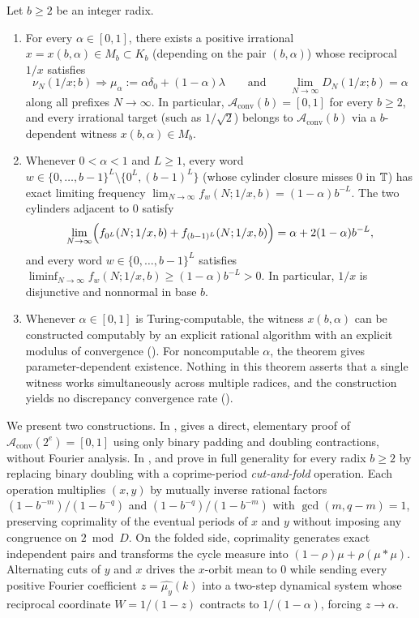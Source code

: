 \documentclass[11pt]{article}
\newcommand{\Aconv}{\mathcal{A}_{\mathrm{conv}}}
\begin{document}
\begin{maintheorem}\label{thm:A}
Let $b\ge2$ be an integer radix.
\begin{enumerate}[label=\textup{(\roman*)},nosep]
\item For every $\alpha\in[0,1]$, there exists a positive irrational $x=x(b,\alpha)\in M_b\subset K_b$ (depending on the pair $(b,\alpha)$) whose reciprocal $1/x$ satisfies
\[
\nu_N(1/x;b)\Longrightarrow \mu_\alpha:=\alpha\delta_0+(1-\alpha)\lambda\qquad\text{and}\qquad \lim_{N\to\infty}D_N(1/x;b)=\alpha
\]
along all prefixes $N\to\infty$. In particular, $\Aconv(b)=[0,1]$ for every $b\ge2$, and every irrational target (such as $1/\sqrt2$) belongs to $\Aconv(b)$ via a $b$-dependent witness $x(b,\alpha)\in M_b$.
\item Whenever $0<\alpha<1$ and $L\ge1$, every word $w\in\{0,\dots,b-1\}^L\setminus\{0^L,(b-1)^L\}$ (whose cylinder closure misses $0$ in $\mathbb T$) has exact limiting frequency $\lim_{N\to\infty}f_w(N;1/x,b)=(1-\alpha)b^{-L}$. The two cylinders adjacent to $0$ satisfy
\[
\lim_{N\to\infty}\Bigl(f_{0^L}(N;1/x,b)+f_{(b-1)^L}(N;1/x,b)\Bigr)=\alpha+2(1-\alpha)b^{-L},
\]
and every word $w\in\{0,\dots,b-1\}^L$ satisfies $\liminf_{N\to\infty}f_w(N;1/x,b)\ge(1-\alpha)b^{-L}>0$. In particular, $1/x$ is disjunctive and nonnormal in base $b$.
\item Whenever $\alpha\in[0,1]$ is Turing-computable, the witness $x(b,\alpha)$ can be constructed computably by an explicit rational algorithm with an explicit modulus of convergence (). For noncomputable $\alpha$, the theorem gives parameter-dependent existence. Nothing in this theorem asserts that a single witness works simultaneously across multiple radices, and the construction yields no discrepancy convergence rate ().
\end{enumerate}
\end{maintheorem}

We present two constructions. In ,  gives a direct, elementary proof of $\Aconv(2^e)=[0,1]$ using only binary padding and doubling contractions, without Fourier analysis. In ,  and  prove  in full generality for every radix $b\ge2$ by replacing binary doubling with a coprime-period \emph{cut-and-fold} operation. Each operation multiplies $(x,y)$ by mutually inverse rational factors $(1-b^{-m})/(1-b^{-q})$ and $(1-b^{-q})/(1-b^{-m})$ with $\gcd(m,q-m)=1$, preserving coprimality of the eventual periods of $x$ and $y$ without imposing any congruence on $2\bmod D$. On the folded side, coprimality generates exact independent pairs and transforms the cycle measure into $(1-\rho)\mu+\rho(\mu*\mu)$. Alternating cuts of $y$ and $x$ drives the $x$-orbit mean to $0$ while sending every positive Fourier coefficient $z=\widehat{\mu_y}(k)$ into a two-step dynamical system whose reciprocal coordinate $W=1/(1-z)$ contracts to $1/(1-\alpha)$, forcing $z\to\alpha$.
\end{document}
